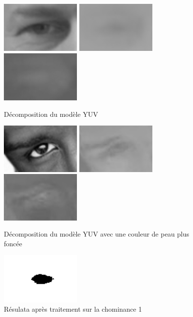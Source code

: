 \begin{figure}[H]
 \center
 \includegraphics[width=4cm]{image/luminance.png}
 \includegraphics[width=4cm]{image/chrominance1.png}
 \includegraphics[width=4cm]{image/chrominance2.png}
 \caption{Décomposition du modèle YUV}
\end{figure}

\begin{figure}[H]
 \center
 \includegraphics[width=4cm]{image/luminance_black.png}
 \includegraphics[width=4cm]{image/chrominance1_black.png}
 \includegraphics[width=4cm]{image/chrominance2_black.png}
 \caption{Décomposition du modèle YUV avec une couleur de peau plus foncée}
\end{figure}

\begin{figure}[H]
 \center
 \includegraphics[width=4cm]{image/pupille.png}
 \caption{Résulata après traitement sur la chominance 1}
\end{figure}

